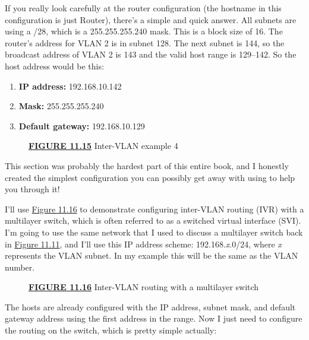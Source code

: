 If you really look carefully at the router configuration (the hostname
in this configuration is just Router), there's a simple and quick
answer. All subnets are using a /28, which is a 255.255.255.240 mask.
This is a block size of 16. The router's address for VLAN 2 is in subnet
128. The next subnet is 144, so the broadcast address of VLAN 2 is 143
and the valid host range is 129--142. So the host address would be this:

\begin{enumerate}
\tightlist
\item
  \textbf{IP address:} 192.168.10.142
\item
  \textbf{Mask:} 255.255.255.240
\item
  \textbf{Default gateway:} 192.168.10.129
\end{enumerate}



\begin{figure}
\centering
\caption{{\protect\hyperlink{c11.xhtmlux5cux23figureanchor11-15}{\textbf{FIGURE
11.15}} Inter-VLAN example 4}}
\end{figure}

This section was probably the hardest part of this entire book, and I
honestly created the simplest configuration you can possibly get away
with using to help you through it!

I'll use \protect\hyperlink{c11.xhtmlux5cux23figure11-16}{Figure 11.16}
to demonstrate configuring inter-VLAN routing (IVR) with a multi­layer
switch, which is often referred to as a switched virtual interface
(SVI). I'm going to use the same network that I used to discuss a
multilayer switch back in
\protect\hyperlink{c11.xhtmlux5cux23figure11-11}{Figure 11.11}, and I'll
use this IP address scheme: 192.168.\emph{x}.0/24, where \emph{x}
represents the VLAN subnet. In my example this will be the same as the
VLAN number.

\begin{figure}
\centering
\caption{{\protect\hyperlink{c11.xhtmlux5cux23figureanchor11-16}{\textbf{FIGURE
11.16}} Inter-VLAN routing with a multilayer switch}}
\end{figure}

The hosts are already configured with the IP address, subnet mask, and
default gateway address using the first address in the range. Now I just
need to configure the routing on the switch, which is pretty simple
actually:

